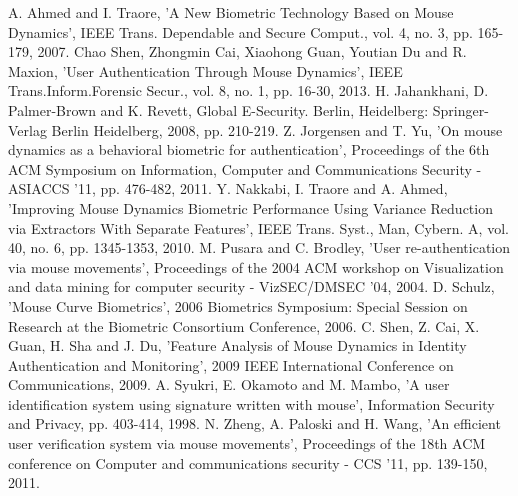 \documentclass[conference]{IEEEtran}
\begin{document}
%

\begin{thebibliography}{100} %


 A. Ahmed and I. Traore, 'A New Biometric Technology Based on Mouse Dynamics', IEEE Trans. Dependable and Secure Comput., vol. 4, no. 3, pp. 165-179, 2007.
 Chao Shen, Zhongmin Cai, Xiaohong Guan, Youtian Du and R. Maxion, 'User Authentication Through Mouse Dynamics', IEEE Trans.Inform.Forensic Secur., vol. 8, no. 1, pp. 16-30, 2013.
 H. Jahankhani, D. Palmer-Brown and K. Revett, Global E-Security. Berlin, Heidelberg: Springer-Verlag Berlin Heidelberg, 2008, pp. 210-219.
 Z. Jorgensen and T. Yu, 'On mouse dynamics as a behavioral biometric for authentication', Proceedings of the 6th ACM Symposium on Information, Computer and Communications Security - ASIACCS '11, pp. 476-482, 2011.
Y. Nakkabi, I. Traore and A. Ahmed, 'Improving Mouse Dynamics Biometric Performance Using Variance Reduction via Extractors With Separate Features', IEEE Trans. Syst., Man, Cybern. A, vol. 40, no. 6, pp. 1345-1353, 2010.
M. Pusara and C. Brodley, 'User re-authentication via mouse movements', Proceedings of the 2004 ACM workshop on Visualization and data mining for computer security - VizSEC/DMSEC '04, 2004.
D. Schulz, 'Mouse Curve Biometrics', 2006 Biometrics Symposium: Special Session on Research at the Biometric Consortium Conference, 2006.
C. Shen, Z. Cai, X. Guan, H. Sha and J. Du, 'Feature Analysis of Mouse Dynamics in Identity Authentication and Monitoring', 2009 IEEE International Conference on Communications, 2009.
A. Syukri, E. Okamoto and M. Mambo, 'A user identification system using signature written with mouse', Information Security and Privacy, pp. 403-414, 1998.
N. Zheng, A. Paloski and H. Wang, 'An efficient user verification system via mouse movements', Proceedings of the 18th ACM conference on Computer and communications security - CCS '11, pp. 139-150, 2011.

\end{thebibliography}
\end{document}
